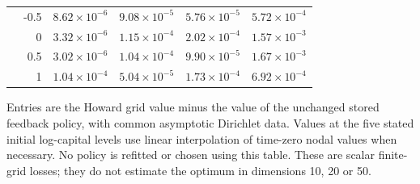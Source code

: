 \begin{table}[!htbp]
\begin{tabular}{lrrrrr}
 & -0.5 & $8.62\times10^{-6}$ & $9.08\times10^{-5}$ & $5.76\times10^{-5}$ & $5.72\times10^{-4}$ \\
 & 0 & $3.32\times10^{-6}$ & $1.15\times10^{-4}$ & $2.02\times10^{-4}$ & $1.57\times10^{-3}$ \\
 & 0.5 & $3.02\times10^{-6}$ & $1.04\times10^{-4}$ & $9.90\times10^{-5}$ & $1.67\times10^{-3}$ \\
 & 1 & $1.04\times10^{-4}$ & $5.04\times10^{-5}$ & $1.73\times10^{-4}$ & $6.92\times10^{-4}$ \\
\bottomrule
\end{tabular}
\par\medskip
\begin{minipage}{0.97\textwidth}\footnotesize
Entries are the Howard grid value minus the value of the unchanged stored feedback policy, with common asymptotic Dirichlet data. Values at the five stated initial log-capital levels use linear interpolation of time-zero nodal values when necessary. No policy is refitted or chosen using this table. These are scalar finite-grid losses; they do not estimate the optimum in dimensions 10, 20 or 50.
\end{minipage}
\end{table}
